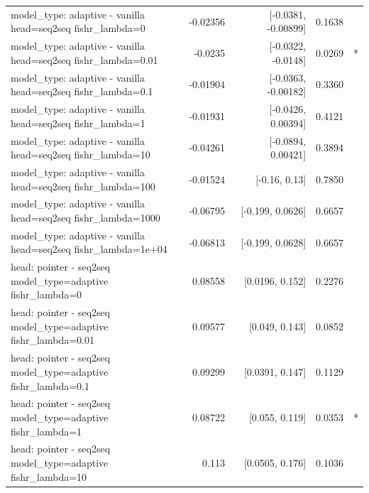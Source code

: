 \documentclass[10pt]{article}
\makeatletter
\newcommand{\stackcell}[1]{\begin{tabular}[t]{@{}l@{}}#1\end{tabular}}
\makeatother
\begin{document}
{\begin{longtable}{lrrrl}
\stackcell{model\_type: adaptive - vanilla\\\footnotesize head=seq2seq fishr\_lambda=0 } & -0.02356 & [-0.0381, -0.00899] & 0.1638 & \\
\stackcell{model\_type: adaptive - vanilla\\\footnotesize head=seq2seq fishr\_lambda=0.01 } & -0.0235 & [-0.0322, -0.0148] & 0.0269 & *\\
\stackcell{model\_type: adaptive - vanilla\\\footnotesize head=seq2seq fishr\_lambda=0.1 } & -0.01904 & [-0.0363, -0.00182] & 0.3360 & \\
\stackcell{model\_type: adaptive - vanilla\\\footnotesize head=seq2seq fishr\_lambda=1 } & -0.01931 & [-0.0426, 0.00394] & 0.4121 & \\
\stackcell{model\_type: adaptive - vanilla\\\footnotesize head=seq2seq fishr\_lambda=10 } & -0.04261 & [-0.0894, 0.00421] & 0.3894 & \\
\stackcell{model\_type: adaptive - vanilla\\\footnotesize head=seq2seq fishr\_lambda=100 } & -0.01524 & [-0.16, 0.13] & 0.7850 & \\
\stackcell{model\_type: adaptive - vanilla\\\footnotesize head=seq2seq fishr\_lambda=1000 } & -0.06795 & [-0.199, 0.0626] & 0.6657 & \\
\stackcell{model\_type: adaptive - vanilla\\\footnotesize head=seq2seq fishr\_lambda=1e+04 } & -0.06813 & [-0.199, 0.0628] & 0.6657 & \\
\stackcell{head: pointer - seq2seq\\\footnotesize model\_type=adaptive fishr\_lambda=0 } & 0.08558 & [0.0196, 0.152] & 0.2276 & \\
\stackcell{head: pointer - seq2seq\\\footnotesize model\_type=adaptive fishr\_lambda=0.01 } & 0.09577 & [0.049, 0.143] & 0.0852 & \\
\stackcell{head: pointer - seq2seq\\\footnotesize model\_type=adaptive fishr\_lambda=0.1 } & 0.09299 & [0.0391, 0.147] & 0.1129 & \\
\stackcell{head: pointer - seq2seq\\\footnotesize model\_type=adaptive fishr\_lambda=1 } & 0.08722 & [0.055, 0.119] & 0.0353 & *\\
\stackcell{head: pointer - seq2seq\\\footnotesize model\_type=adaptive fishr\_lambda=10 } & 0.113 & [0.0505, 0.176] & 0.1036 & \\

\end{longtable}}
\end{document}
